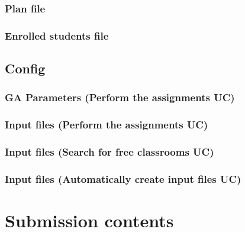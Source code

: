 \subsubsection{Plan file}
\subsubsection{Enrolled students file}


\subsection{Config}

\subsubsection{GA Parameters (Perform the assignments UC)}
\subsubsection{Input files (Perform the assignments UC)}
\subsubsection{Input files (Search for free classrooms UC)}
\subsubsection{Input files (Automatically create input files UC)}



\section{Submission contents}

